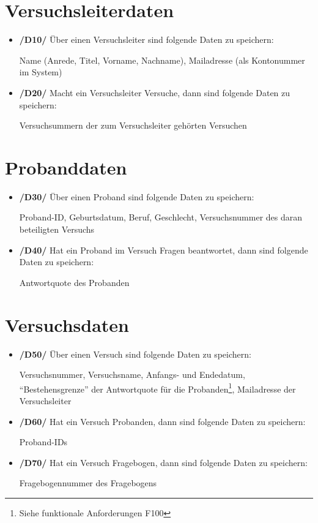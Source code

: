 \documentclass[a4paper]{scrreprt}
\begin{document}
        \section{\gls{Versuchsleiter}daten}
            \begin{itemize}
                \item \textbf{/D10/} Über einen \gls{Versuchsleiter} sind folgende Daten zu speichern:
                    \par Name (Anrede, Titel, Vorname, Nachname), Mailadresse (als Kontonummer im System)

                \item \textbf{/D20/} Macht ein \gls{Versuchsleiter} Versuche, dann sind folgende Daten zu speichern:
                    \par Versuchsummern der zum \gls{Versuchsleiter} gehörten Versuchen
            \end{itemize}

        \section{\gls{Proband}daten}
            \begin{itemize}
                \item \textbf{/D30/} Über einen \gls{Proband} sind folgende Daten zu speichern:
                    \par \gls{Proband}-ID, Geburtsdatum, Beruf, Geschlecht, Versuchsnummer des daran beteiligten Versuchs

                \item \textbf{/D40/} Hat ein \gls{Proband} im Versuch Fragen beantwortet, dann sind folgende Daten zu speichern:
                    \par \gls{Antwortquote} des \gls{Proband}en
            \end{itemize}

        \section{Versuchsdaten}
            \begin{itemize}
                \item \textbf{/D50/} Über einen Versuch sind folgende Daten zu speichern:
                    \par Versuchsnummer, Versuchsname, Anfangs- und Endedatum, “Bestehensgrenze” der \gls{Antwortquote} für die \gls{Proband}en\footnote{Siehe funktionale Anforderungen F100}, Mailadresse der \gls{Versuchsleiter}

                \item \textbf{/D60/} Hat ein Versuch \gls{Proband}en, dann sind folgende Daten zu speichern:
                    \par \gls{Proband}-IDs

                \item \textbf{/D70/} Hat ein Versuch Fragebogen, dann sind folgende Daten zu speichern:
                    \par Fragebogennummer des Fragebogens
            \end{itemize}
\end{document}
